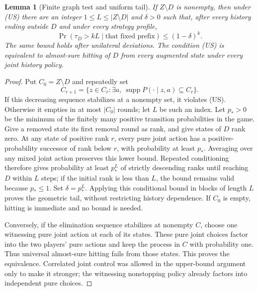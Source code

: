 \documentclass[11pt,a4paper]{article}
\newtheorem{lemma}[theorem]{Lemma}
\theoremstyle{definition}
\theoremstyle{remark}
\begin{document}
\begin{lemma}[Finite graph test and uniform tail]
If $Z\setminus D$ is nonempty, then under (US) there are an integer $1\leq L\leq |Z\setminus D|$ and $\delta>0$ such that, after every history ending outside $D$ and under every strategy profile,
\[
 \Pr(\tau_D>kL\mid\text{that fixed prefix})\leq(1-\delta)^k.
\]
The same bound holds after unilateral deviations. The condition (US) is equivalent to almost-sure hitting of $D$ from every augmented state under every joint history policy.
\end{lemma}
\begin{proof}
Put $C_0=Z\setminus D$ and repeatedly set
\[
 C_{r+1}=\{z\in C_r:\exists a,\ \operatorname{supp}P(\cdot\mid z,a)\subseteq C_r\}.
\]
If this decreasing sequence stabilizes at a nonempty set, it violates (US). Otherwise it empties in at most $|C_0|$ rounds; let $L$ be such an index. Let $p_*>0$ be the minimum of the finitely many positive transition probabilities in the game. Give a removed state its first removal round as rank, and give states of $D$ rank zero. At any state of positive rank $r$, every pure joint action has a positive-probability successor of rank below $r$, with probability at least $p_*$. Averaging over any mixed joint action preserves this lower bound. Repeated conditioning therefore gives probability at least $p_*^L$ of strictly descending ranks until reaching $D$ within $L$ steps; if the initial rank is less than $L$, the bound remains valid because $p_*\leq1$. Set $\delta=p_*^L$. Applying this conditional bound in blocks of length $L$ proves the geometric tail, without restricting history dependence. If $C_0$ is empty, hitting is immediate and no bound is needed.

Conversely, if the elimination sequence stabilizes at nonempty $C$, choose one witnessing pure joint action at each of its states. These pure joint choices factor into the two players' pure actions and keep the process in $C$ with probability one. Thus universal almost-sure hitting fails from those states. This proves the equivalence. Correlated joint control was allowed in the upper-bound argument only to make it stronger; the witnessing nonstopping policy already factors into independent pure choices.
\end{proof}
\end{document}
